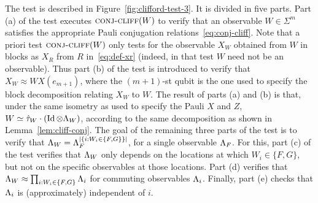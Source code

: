 The test is described in Figure~\ref{fig:clifford-test-3}. It is divided in five
parts. Part (a) of the test executes  $\textsc{conj-cliff}(W)$ to verify that an observable
$W\in\Sigma^m$ satisfies the appropriate Pauli conjugation
relations~\eqref{eq:conj-cliff}. Note that a priori test $\textsc{conj-cliff}(W)$ only tests
for the observable $X_W$ obtained from $W$ in blocks as $X_R$ from $R$
in~\eqref{eq:def-xr} (indeed, in that test $W$ need not be an observable). Thus
part (b) of the test is introduced to verify that $X_W \approx W X(e_{m+1})$, where the $(m+1)$-st qubit is the one used to specify the block decomposition relating $X_W$ to $W$.  The result of parts (a) and (b) is that, under the same isometry as used to specify the Pauli $X$ and $Z$, $W\simeq \hat{\tau}_W \cdot (\mathop{\rm Id}\nolimits\otimes \Lambda_W)$, according to the same decomposition as shown in Lemma~\ref{lem:cliff-conj}. The goal of the remaining three parts of the test is to verify that $\Lambda_W = \Lambda_F^{|\{i: W_i \in \{F,G\}\}|}$, for a single observable $\Lambda_F$. For this, part (c) of the test verifies that $\Lambda_W$ only depends on the locations at which $W_i\in\{F,G\}$, but not on the specific observables at those locations. Part (d) verifies that $\Lambda_W \approx \prod_{i: W_i\in \{F,G\}} \Lambda_i $ for commuting observables $\Lambda_i$. Finally, part (e) checks that $\Lambda_i$ is (approximately) independent of $i$. 

